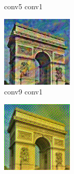 \documentclass[twocolumn,superscriptaddress,aps, floatfix]{revtex4-1}
\begin{document}
\begin{figure}[ht]
\begin{subfigure}[b]{0.1\textwidth}
            \caption{conv5 conv1}
        \end{subfigure}
        \hfill
        \begin{subfigure}[b]{0.1\textwidth}
            \centering
            \includegraphics[width=\textwidth]{resources/png/layers/conv9_conv1.png}
            \caption{conv9 conv1}
        \end{subfigure}
        \begin{subfigure}[b]{0.1\textwidth}
            \centering
            \includegraphics[width=\textwidth]{resources/png/layers/conv1_conv3.png}

\end{subfigure}
\end{figure}
\end{document}
